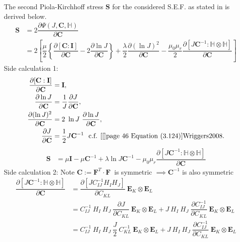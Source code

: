 The second Piola-Kirchhoff stress $\mathbf{S}$ for the considered S.E.F. as stated in  is derived below.
\begin{align*}
\mathbf{S} &= 2 \dfrac{\partial \Psi (J, \mathbf{C}, \mathbb{H})}{\partial \mathbf{C}} \\
&= 2 \left[ \dfrac{\mu}{2} \left\lbrace \dfrac{\partial [\mathbf{C} : \mathbf{I}]}{\partial \mathbf{C}} - 2 \dfrac{\partial \ln J}{\partial \mathbf{C}} \right\rbrace + \dfrac{\lambda}{2} \dfrac{\partial (\ln J)^2}{\partial \mathbf{C}} - \dfrac{\mu_0 \mu_r}{2} \dfrac{\partial [J \mathbf{C}^{-1} : \mathbb{H} \otimes \mathbb{H}]}{\partial \mathbf{C}} \right]
\end{align*}
Side calculation 1:
\begin{align*}
\dfrac{\partial [\mathbf{C} : \mathbf{I}]}{\partial \mathbf{C}} &= \mathbf{I}, \\ 
\dfrac{\partial \ln J}{\partial \mathbf{C}} &= \dfrac{1}{J} \dfrac{\partial J}{\partial \mathbf{C}}, \\
\dfrac{\partial (\ln J)^2}{\partial \mathbf{C}} &= 2 \ \ln J \ \dfrac{\partial \ln J}{\partial \mathbf{C}}, \\
\dfrac{\partial J}{\partial \mathbf{C}} &= \dfrac{1}{2} J \mathbf{C}^{-1} \ \  \text{c.f. \cite[see][page 46 Equation (3.124)]{Wriggers2008}}.
\end{align*}
\begin{align*}
\mathbf{S} &= \mu \mathbf{I} -  \mu \mathbf{C}^{-1} + \lambda \ln J \mathbf{C}^{-1} - \mu_0 \mu_r \dfrac{\partial [J \mathbf{C}^{-1} : \mathbb{H} \otimes \mathbb{H}]}{\partial \mathbf{C}}
\end{align*}
Side calculation 2: Note $\mathbf{C} := \mathbf{F}^T \cdot \mathbf{F} \ $ is symmetric $\implies \mathbf{C}^{-1}$ is also symmetric 
\begin{align*}
\dfrac{\partial [J \mathbf{C}^{-1} : \mathbb{H} \otimes \mathbb{H}]}{\partial \mathbf{C}} &= \dfrac{\partial [J C^{-1}_{IJ} H_I H_J]}{\partial C_{KL}} \ \mathbf{E}_K \otimes \mathbf{E}_L \\
&= C^{-1}_{IJ} \ H_I \ H_J \ \dfrac{\partial J}{\partial C_{KL}} \ \mathbf{E}_K \otimes \mathbf{E}_L + J \ H_I \ H_J \ \dfrac{\partial C^{-1}_{IJ}}{\partial C_{KL}} \ \mathbf{E}_K \otimes \mathbf{E}_L \\
&= C^{-1}_{IJ} \ H_I \ H_J \ \dfrac{J}{2} \ C^{-1}_{KL} \ \mathbf{E}_K \otimes \mathbf{E}_L + J \ H_I \ H_J \  \dfrac{\partial C^{-1}_{IJ}}{\partial C_{KL}} \ \mathbf{E}_K \otimes \mathbf{E}_L
\end{align*}
